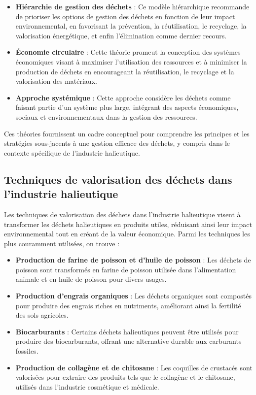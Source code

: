\documentclass[12pt,a4paper]{report}
\begin{document}
\begin{itemize}
    \item \textbf{Hiérarchie de gestion des déchets} : Ce modèle hiérarchique recommande de prioriser les options de gestion des déchets en fonction de leur impact environnemental, en favorisant la prévention, la réutilisation, le recyclage, la valorisation énergétique, et enfin l'élimination comme dernier recours.
    \item \textbf{Économie circulaire} : Cette théorie promeut la conception des systèmes économiques visant à maximiser l'utilisation des ressources et à minimiser la production de déchets en encourageant la réutilisation, le recyclage et la valorisation des matériaux.
    \item \textbf{Approche systémique} : Cette approche considère les déchets comme faisant partie d'un système plus large, intégrant des aspects économiques, sociaux et environnementaux dans la gestion des ressources.
\end{itemize}

Ces théories fournissent un cadre conceptuel pour comprendre les principes et les stratégies sous-jacents à une gestion efficace des déchets, y compris dans le contexte spécifique de l'industrie halieutique.

\subsection{Techniques de valorisation des déchets dans l'industrie halieutique}
Les techniques de valorisation des déchets dans l'industrie halieutique visent à transformer les déchets halieutiques en produits utiles, réduisant ainsi leur impact environnemental tout en créant de la valeur économique. Parmi les techniques les plus couramment utilisées, on trouve :

\begin{itemize}
    \item \textbf{Production de farine de poisson et d'huile de poisson} : Les déchets de poisson sont transformés en farine de poisson utilisée dans l'alimentation animale et en huile de poisson pour divers usages.
    \item \textbf{Production d'engrais organiques} : Les déchets organiques sont compostés pour produire des engrais riches en nutriments, améliorant ainsi la fertilité des sols agricoles.
    \item \textbf{Biocarburants} : Certains déchets halieutiques peuvent être utilisés pour produire des biocarburants, offrant une alternative durable aux carburants fossiles.
    \item \textbf{Production de collagène et de chitosane} : Les coquilles de crustacés sont valorisées pour extraire des produits tels que le collagène et le chitosane, utilisés dans l'industrie cosmétique et médicale.
\end{itemize}
\end{document}
